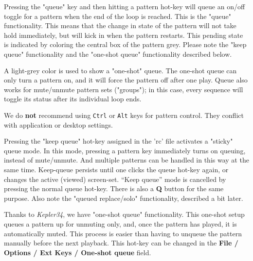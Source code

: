    Pressing the "queue" key and then hitting a pattern hot-key
   will queue an on/off toggle for a pattern when the end of the loop is
   reached.
   This is the "queue" functionality.
   This means that the change in state of the pattern will not take hold
   immediately, but will kick in when the pattern restarts.
   This pending state is indicated by coloring the central box of the
   pattern grey.
   Please note the "keep queue" functionality and
   the "one-shot queue" functionality described below.

   A light-grey color is used to show a "one-shot" queue.
   The one-shot queue can only turn a pattern on, and it
   will force the pattern off after one play.
   Queue also works for mute/unmute pattern sets ("groups"); in this case,
   every sequence will toggle its status after its individual loop ends. 

   We do \textbf{not}
   recommend using \texttt{Ctrl} or \texttt{Alt}
   keys for pattern control.  They conflict with application or desktop
   settings.

   Pressing the "keep queue" hot-key
   assigned in the 'rc' file activates a "sticky" queue mode.
   In this mode, pressing a pattern key immediately turns on queuing, instead
   of mute/unmute.  And multiple patterns can be handled in this way at the
   same time.
   Keep-queue persists until one clicks the queue hot-key again,
   or changes the active (viewed) screen-set. 
   “Keep queue” mode is cancelled by pressing the normal queue hot-key.
   There is also a \textbf{Q} button for the same purpose.
   Also note the "queued replace/solo" functionality, described a bit later.

   Thanks to \textsl{Kepler34}, we have "one-shot queue"
   functionality.  This one-shot setup queues a pattern up for unmuting only,
   and, once the pattern has played, it is automatically muted.  This process
   is easier than having to unqueue the pattern manually before the next
   playback.
   This hot-key can be changed in the
   \textbf{File / Options / Ext Keys / One-shot queue} field.

